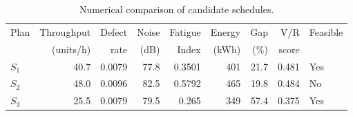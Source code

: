 \begin{table}[htbp]
\centering
\caption{Numerical comparison of candidate schedules.}
\label{tab:numerical-sim}
\small
\begin{tabular}{@{}lrrrrrrrl@{}}
\toprule
Plan & Throughput & Defect & Noise & Fatigue & Energy & Gap & V/R & Feasible \\
     & (units/h)  & rate   & (dB)  & Index   & (kWh)  & (\%) & score &         \\
\midrule
$S_{1}$ & 40.7 & 0.0079 & 77.8 & 0.3501 & 401 & 21.7 & 0.481 & Yes \\
$S_{2}$ & 48.0 & 0.0096 & 82.5 & 0.5792 & 465 & 19.8 & 0.484 & No \\
$S_{3}$ & 25.5 & 0.0079 & 79.5 & 0.265 & 349 & 57.4 & 0.375 & Yes \\
\bottomrule
\end{tabular}
\end{table}
